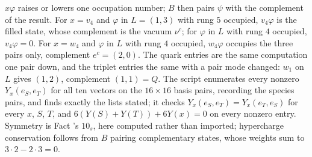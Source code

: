 $x\varphi$ raises or lowers one occupation number; $B$ then pairs $\psi$ with the complement of the result. For $x = v_{4}$ and $\varphi$ in $L = (1,3)$ with rung $5$ occupied, $v_{4}\varphi$ is the filled state, whose complement is the vacuum $\nu^{c}$; for $\varphi$ in $L$ with rung $4$ occupied, $v_{4}\varphi = 0$. For $x = w_{4}$ and $\varphi$ in $L$ with rung $4$ occupied, $w_{4}\varphi$ occupies the three pairs only, complement $e^{c} = (2,0)$. The quark entries are the same computation one pair down, and the triplet entries the same with a pair mode changed: $w_{1}$ on $L$ gives $(1,2)$, complement $(1,1) = Q$. The script enumerates every nonzero $Y_{x}(e_{S}, e_{T})$ for all ten vectors on the $16 \times 16$ basis pairs, recording the species pairs, and finds exactly the lists stated; it checks $Y_{x}(e_{S}, e_{T}) = Y_{x}(e_{T}, e_{S})$ for every $x$, $S$, $T$, and $6(Y(S) + Y(T)) + 6Y(x) = 0$ on every nonzero entry. Symmetry is Fact 's $10_{s}$, here computed rather than imported; hypercharge conservation follows from $B$ pairing complementary states, whose weights sum to $3 \cdot 2 - 2 \cdot 3 = 0$.
